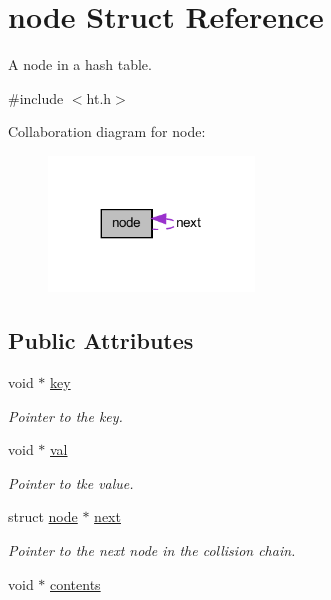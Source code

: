 \hypertarget{structnode}{
\section{node Struct Reference}
\label{structnode}
}


A node in a hash table.  




{\ttfamily \#include $<$ht.h$>$}



Collaboration diagram for node:
\nopagebreak
\begin{figure}[H]
\begin{center}
\leavevmode
\includegraphics[width=155pt]{structnode__coll__graph}
\end{center}
\end{figure}
\subsection*{Public Attributes}
\begin{DoxyCompactItemize}
\item 
void $\ast$ \hyperlink{structnode_a72c8a0c41b801c92db89c5078642f28b}{key}
\begin{DoxyCompactList}\small\item\em Pointer to the key. \item\end{DoxyCompactList}\item 
void $\ast$ \hyperlink{structnode_a3866f55c05d50265b730d8cdeec0a1f8}{val}
\begin{DoxyCompactList}\small\item\em Pointer to tke value. \item\end{DoxyCompactList}\item 
struct \hyperlink{structnode}{node} $\ast$ \hyperlink{structnode_a111a569ab2765add9b91c9f94cf9f063}{next}
\begin{DoxyCompactList}\small\item\em Pointer to the next node in the collision chain. \item\end{DoxyCompactList}\item 
void $\ast$ \hyperlink{structnode_a6658978058886a89ccc39f1d1a56e6d1}{contents}
\end{DoxyCompactItemize}


